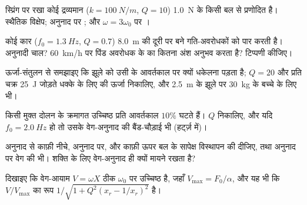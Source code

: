 \begin{exercise}[$\star$]\label{exo:b1:oscillators-resonance:4}
स्प्रिंग पर रखा कोई द्रव्यमान ($k = \qty{100}{N/m}$, $Q = 10$) \qty{1.0}{N}
 के किसी बल से प्रणोदित है। स्थैतिक विक्षेप; अनुनाद पर ; और
$\omega = 3\omega_0$ पर ।
\end{exercise}

\begin{exercise}[$\star\star$]\label{exo:b1:oscillators-resonance:5}
कोई कार ($f_0 = \qty{1.3}{Hz}$, $Q = 0.7$) \qty{8.0}{m} की दूरी पर बने
गति-अवरोधकों को पार करती है। अनुनादी चाल? \qty{60}{km/h} पर पिंड अवरोधक के
 का कितना अंश अनुभव करता है? टिप्पणी कीजिए।
\end{exercise}

\begin{exercise}[$\star\star$]\label{exo:b1:oscillators-resonance:6}
ऊर्जा-संतुलन से समझाइए कि झूले को उसी के आवर्तकाल पर क्यों धकेलना पड़ता है;
$Q = 20$ और प्रति चक्र \qty{25}{J} जोड़ते धक्के के लिए  की
ऊर्जा निकालिए, और \qty{2.5}{m} के झूले पर \qty{30}{kg} के बच्चे के लिए
 भी।
\end{exercise}

\begin{exercise}[$\star\star$]\label{exo:b1:oscillators-resonance:7}
किसी मुक्त दोलन के क्रमागत उच्चिष्ठ प्रति आवर्तकाल $10\%$ घटते हैं। $Q$
निकालिए, और यदि $f_0 = \qty{2.0}{Hz}$ हो तो उसके वेग-अनुनाद की बैंड-चौड़ाई
भी (हर्ट्ज़ में)।
\end{exercise}

\begin{exercise}[$\star\star$]\label{exo:b1:oscillators-resonance:8}
अनुनाद से काफ़ी नीचे, अनुनाद पर, और काफ़ी ऊपर बल के सापेक्ष विस्थापन की
 दीजिए, तथा अनुनाद पर वेग की  भी। शक्ति के लिए वेग-अनुनाद ही क्यों
मायने रखता है?
\end{exercise}

\begin{exercise}[$\star\star$]\label{exo:b1:oscillators-resonance:9}
दिखाइए कि वेग-आयाम $V = \omega X$ ठीक $\omega_0$ पर उच्चिष्ठ है, जहाँ
$V_{\max} = F_0/\alpha$, और यह भी कि $V/V_{\max}$ का रूप
$1/\sqrt{1 + Q^2(x_r - 1/x_r)^2}$ है।
\end{exercise}

